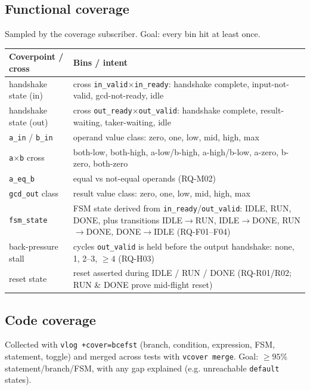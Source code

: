 \documentclass[11pt,a4paper]{article}
\begin{document}
\subsection*{Functional coverage}
Sampled by the coverage subscriber. Goal: every bin hit at least once.

\begin{table}[H]
\centering
\begin{tabular}{@{}p{4.2cm} p{9.5cm}@{}}
\toprule
\textbf{Coverpoint / cross} & \textbf{Bins / intent} \\
\midrule
handshake state (in) & cross \texttt{in\_valid}$\times$\texttt{in\_ready}: handshake complete, input-not-valid, gcd-not-ready, idle \\
handshake state (out) & cross \texttt{out\_ready}$\times$\texttt{out\_valid}: handshake complete, result-waiting, taker-waiting, idle \\
\texttt{a\_in} / \texttt{b\_in} & operand value class: zero, one, low, mid, high, max \\
\texttt{a}$\times$\texttt{b} cross & both-low, both-high, a-low/b-high, a-high/b-low, a-zero, b-zero, both-zero \\
\texttt{a\_eq\_b} & equal vs not-equal operands (RQ-M02) \\
\texttt{gcd\_out} class & result value class: zero, one, low, mid, high, max \\
\texttt{fsm\_state} & FSM state derived from \texttt{in\_ready}/\texttt{out\_valid}: IDLE, RUN, DONE, plus transitions IDLE$\to$RUN, IDLE$\to$DONE, RUN$\to$DONE, DONE$\to$IDLE (RQ-F01--F04) \\
back-pressure stall & cycles \texttt{out\_valid} is held before the output handshake: none, 1, 2--3, $\geq 4$ (RQ-H03) \\
reset state & reset asserted during IDLE / RUN / DONE (RQ-R01/R02; RUN \& DONE prove mid-flight reset) \\
\bottomrule
\end{tabular}
\end{table}

\subsection*{Code coverage}
Collected with \texttt{vlog +cover=bcefst} (branch, condition, expression, FSM,
statement, toggle) and merged across tests with \texttt{vcover merge}. Goal:
$\geq 95\%$ statement/branch/FSM, with any gap explained (e.g. unreachable
\texttt{default} states).
\end{document}
